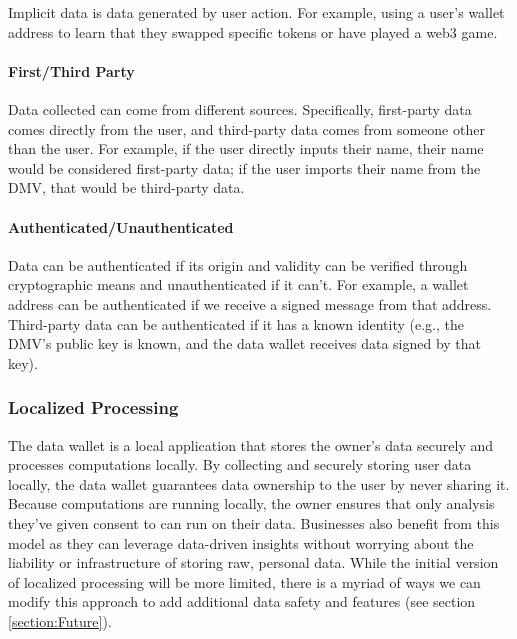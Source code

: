 Implicit data is data generated by user action. For example, using a user's wallet address to learn that they swapped specific tokens or have played a web3 game. 


\paragraph{First/Third Party}
Data collected can come from different sources. Specifically, first-party data comes directly from the user, and third-party data comes from 
someone other than the user. For example, if the user directly inputs their name, their name would be considered first-party data; if the 
user imports their name from the DMV, that would be third-party data.


\paragraph{Authenticated/Unauthenticated}
Data can be authenticated if its origin and validity can be verified through cryptographic means and unauthenticated if it can't. For example, 
a wallet address can be authenticated if we receive a signed message from that address. Third-party data can be authenticated if it has a known 
identity (e.g., the DMV's public key is known, and the data wallet receives data signed by that key). 

\subsubsection{Localized Processing} %
The data wallet is a local application that stores the owner's data securely and processes computations locally. By collecting and 
securely storing user data locally, the data wallet guarantees data ownership to the user by never sharing it. Because computations 
are running locally, the owner ensures that only analysis they've given consent to can run on their data. Businesses also benefit 
from this model as they can leverage data-driven insights without worrying about the liability or infrastructure of storing raw, 
personal data. While the initial version of localized processing will be more limited, there is a myriad of ways we can modify this 
approach to add additional data safety and features (see section \ref{section:Future}). 

